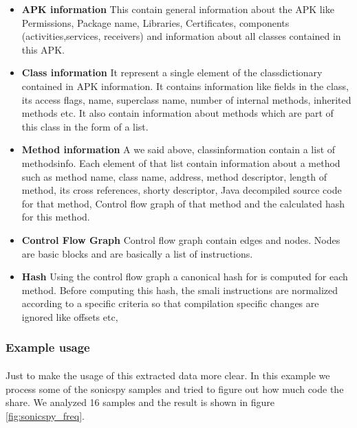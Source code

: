 \documentclass[../main.tex]{subfile}
\begin{document}
		
		\begin{itemize}
			\item \textbf{APK information} This contain general information about the APK like Permissions, Package name, Libraries, Certificates, components (activities,services, receivers) and information about all classes contained in this APK.
			\item \textbf{Class information} It represent a single element of the class\textunderscore dictionary contained in APK information. It contains information like fields in the class, its access flags, name, superclass name, number of internal methods, inherited methods etc. It also contain information about methods which are part of this class in the form of a list.
			\item \textbf{Method information} A we said above, class\textunderscore information contain a list of methods\textunderscore info. Each element of that list contain information about a method such as method name, class name, address, method descriptor, length of method, its cross references, shorty descriptor, Java decompiled source code for that method, Control flow graph of that method and the calculated hash for this method.
			\item \textbf{Control Flow Graph} Control flow graph contain edges and nodes. Nodes are basic blocks and are basically a list of instructions.
			\item \textbf{Hash} Using the control flow graph a canonical hash for is computed for each method. Before computing this hash, the smali instructions are normalized according to a specific criteria so that compilation specific changes are ignored like offsets etc,  
		\end{itemize}
		
		\subsubsection{Example usage}
		\paragraph{}Just to make the usage of this extracted data more clear. In this example we process some of the sonicspy samples and tried to figure out how much code the share. We analyzed 16 samples  and the result is shown in figure \ref{fig:sonicspy_freq}.
		
\end{document}
